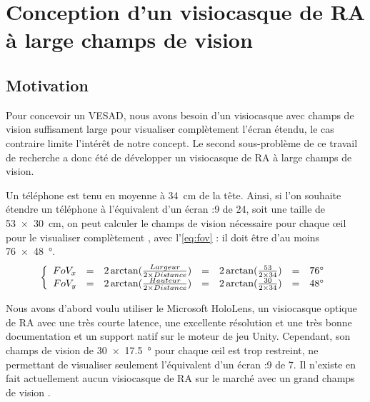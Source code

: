 \chapter{Conception d'un visiocasque de RA à large champs de vision}
\label{ch:methodology}

\section{Motivation}
Pour concevoir un VESAD, nous avons besoin d'un visiocasque avec champs de vision suffisament large pour visualiser complètement l'écran étendu, le cas contraire limite l'intérêt de notre concept. Le second sous-problème de ce travail de recherche a donc été de développer un visiocasque de RA à large champs de vision.

Un téléphone est tenu en moyenne à \SI{34}{\cm} \citep{Bababekova2011} de la tête. Ainsi, si l'on souhaite étendre un téléphone à l'équivalent d'un écran {:9} de \SI{24}{\inch}, soit une taille de \SI{53x30}{\cm}, on peut calculer le champs de vision nécessaire pour chaque \oe il pour le visualiser complètement , avec l'\autoref{eq:fov} : il doit être d'au moins \SI{76x48}{\degree}.
\begin{equation}
  \label{eq:fov}
  \left \{
  \begin{array}{r c c c c c l}
    FoV_x & = & 2 \arctan (\frac{Largeur}{2 \times Distance}) & = & 2 \arctan (\frac{53}{2 \times 34}) & = & \ang{76}\\
    FoV_y & = & 2 \arctan (\frac{Hauteur}{2 \times Distance}) & = & 2 \arctan (\frac{30}{2 \times 34}) & = & \ang{48}
  \end{array}
  \right .
\end{equation}


Nous avons d'abord voulu utiliser le Microsoft HoloLens, un visiocasque optique de RA avec une très courte latence, une excellente résolution et une très bonne documentation et un support natif sur le moteur de jeu Unity. Cependant, son champs de vision de \SI{30x17.5}{\degree} pour chaque \oe il \citep{Kreylos2015} est trop restreint, ne permettant de visualiser seulement l'équivalent d'un écran {:9} de \SI{7}{\inch}. Il n'existe en fait actuellement aucun visiocasque de RA sur le marché avec un grand champs de vision \citep[p. 25]{Millette2016}.



